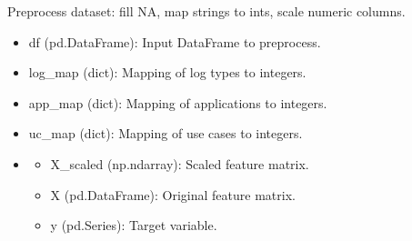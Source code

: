 \documentclass[letterpaper,10pt,english]{sphinxmanual}
\begin{document}
\begin{fulllineitems}
\label{\detokenize{eda:eda.preprocess_data}}
\pysigstartsignatures
{}
\pysigstopsignatures
\sphinxAtStartPar
Preprocess dataset: fill NA, map strings to ints, scale numeric columns.
\begin{description}
\begin{itemize}
\item {} 
\sphinxAtStartPar
df (pd.DataFrame): Input DataFrame to preprocess.

\item {} 
\sphinxAtStartPar
log\_map (dict): Mapping of log types to integers.

\item {} 
\sphinxAtStartPar
app\_map (dict): Mapping of applications to integers.

\item {} 
\sphinxAtStartPar
uc\_map (dict): Mapping of use cases to integers.

\end{itemize}

\begin{itemize}
\item {} \begin{description}
\begin{itemize}
\item {} 
\sphinxAtStartPar
X\_scaled (np.ndarray): Scaled feature matrix.

\item {} 
\sphinxAtStartPar
X (pd.DataFrame): Original feature matrix.

\item {} 
\sphinxAtStartPar
y (pd.Series): Target variable.

\end{itemize}

\end{description}

\end{itemize}

\end{description}

\end{fulllineitems}
\end{document}
